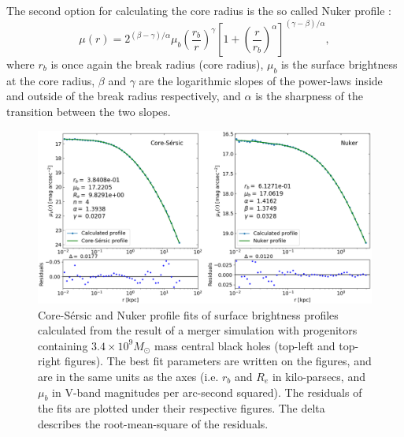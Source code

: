\documentclass[english, oneside]{HYgradu}
\begin{document}
The second option for calculating the core radius is the so called Nuker profile \citep{Lauer1995}:
\begin{equation}
\mu(r) = 2^{(\beta - \gamma) / \alpha} \mu_b \left( \frac{r_b}{r} \right)^\gamma \left[ 1 + \left( \frac{r}{r_b} \right)^\alpha \right]^{(\gamma - \beta)/\alpha},
\label{eq:nuker}
\end{equation}
where $r_b$ is once again the break radius (core radius), $\mu_b$ is the surface brightness at the core radius, $\beta$ and $\gamma$ are the logarithmic slopes of the power-laws inside and outside of the break radius respectively, and $\alpha$ is the sharpness of the transition between the two slopes.

\begin{figure}[h]
	\centering
	\includegraphics[width=\textwidth]{core_nuker_fits.png}
	\caption{Core-Sérsic and Nuker profile fits of surface brightness profiles calculated from the result of a merger simulation with progenitors containing $3.4 \times 10^9 M_\odot$ mass central black holes (top-left and top-right figures). The best fit parameters are written on the figures, and are in the same units as the axes (i.e. $r_b$ and $R_e$ in kilo-parsecs, and $\mu_b$ in V-band magnitudes per arc-second squared). The residuals of the fits are plotted under their respective figures. The delta describes the root-mean-square of the residuals.}
\end{figure}
\end{document}
